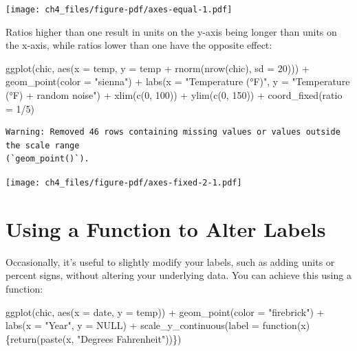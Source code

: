 \documentclass[
  letterpaper,
  DIV=11,
  numbers=noendperiod]{scrreprt}
\newenvironment{Shaded}{\begin{snugshade}}{\end{snugshade}}
\newcommand{\AttributeTok}[1]{\textcolor[rgb]{0.40,0.45,0.13}{#1}}
\newcommand{\ConstantTok}[1]{\textcolor[rgb]{0.56,0.35,0.01}{#1}}
\newcommand{\ControlFlowTok}[1]{\textcolor[rgb]{0.00,0.23,0.31}{#1}}
\newcommand{\DecValTok}[1]{\textcolor[rgb]{0.68,0.00,0.00}{#1}}
\newcommand{\FunctionTok}[1]{\textcolor[rgb]{0.28,0.35,0.67}{#1}}
\newcommand{\NormalTok}[1]{\textcolor[rgb]{0.00,0.23,0.31}{#1}}
\newcommand{\SpecialCharTok}[1]{\textcolor[rgb]{0.37,0.37,0.37}{#1}}
\newcommand{\StringTok}[1]{\textcolor[rgb]{0.13,0.47,0.30}{#1}}
\begin{document}
\texttt{[image: ch4\_files/figure-pdf/axes-equal-1.pdf]}

Ratios higher than one result in units on the y-axis being longer than
units on the x-axis, while ratios lower than one have the opposite
effect:

\begin{Shaded}
\begin{Highlighting}[]
\FunctionTok{ggplot}\NormalTok{(chic, }\FunctionTok{aes}\NormalTok{(}\AttributeTok{x =}\NormalTok{ temp, }\AttributeTok{y =}\NormalTok{ temp }\SpecialCharTok{+} \FunctionTok{rnorm}\NormalTok{(}\FunctionTok{nrow}\NormalTok{(chic), }\AttributeTok{sd =} \DecValTok{20}\NormalTok{))) }\SpecialCharTok{+}
  \FunctionTok{geom\_point}\NormalTok{(}\AttributeTok{color =} \StringTok{"sienna"}\NormalTok{) }\SpecialCharTok{+}
  \FunctionTok{labs}\NormalTok{(}\AttributeTok{x =} \StringTok{"Temperature (°F)"}\NormalTok{, }\AttributeTok{y =} \StringTok{"Temperature (°F) + random noise"}\NormalTok{) }\SpecialCharTok{+}
  \FunctionTok{xlim}\NormalTok{(}\FunctionTok{c}\NormalTok{(}\DecValTok{0}\NormalTok{, }\DecValTok{100}\NormalTok{)) }\SpecialCharTok{+} \FunctionTok{ylim}\NormalTok{(}\FunctionTok{c}\NormalTok{(}\DecValTok{0}\NormalTok{, }\DecValTok{150}\NormalTok{)) }\SpecialCharTok{+}
  \FunctionTok{coord\_fixed}\NormalTok{(}\AttributeTok{ratio =} \DecValTok{1}\SpecialCharTok{/}\DecValTok{5}\NormalTok{)}
\end{Highlighting}
\end{Shaded}

\begin{verbatim}
Warning: Removed 46 rows containing missing values or values outside the scale range
(`geom_point()`).
\end{verbatim}

\texttt{[image: ch4\_files/figure-pdf/axes-fixed-2-1.pdf]}

\section{Using a Function to Alter
Labels}\label{using-a-function-to-alter-labels}

Occasionally, it's useful to slightly modify your labels, such as adding
units or percent signs, without altering your underlying data. You can
achieve this using a function:

\begin{Shaded}
\begin{Highlighting}[]
\FunctionTok{ggplot}\NormalTok{(chic, }\FunctionTok{aes}\NormalTok{(}\AttributeTok{x =}\NormalTok{ date, }\AttributeTok{y =}\NormalTok{ temp)) }\SpecialCharTok{+}
  \FunctionTok{geom\_point}\NormalTok{(}\AttributeTok{color =} \StringTok{"firebrick"}\NormalTok{) }\SpecialCharTok{+}
  \FunctionTok{labs}\NormalTok{(}\AttributeTok{x =} \StringTok{"Year"}\NormalTok{, }\AttributeTok{y =} \ConstantTok{NULL}\NormalTok{) }\SpecialCharTok{+}
  \FunctionTok{scale\_y\_continuous}\NormalTok{(}\AttributeTok{label =} \ControlFlowTok{function}\NormalTok{(x) \{}\FunctionTok{return}\NormalTok{(}\FunctionTok{paste}\NormalTok{(x, }\StringTok{"Degrees Fahrenheit"}\NormalTok{))\})}
\end{Highlighting}
\end{Shaded}
\end{document}
